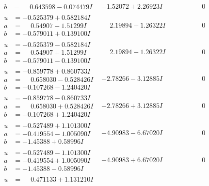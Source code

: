 \documentclass[1p]{elsarticle_modified}
\theoremstyle{definition}
\begin{document}
$$\begin{array}{c|c|c}
\begin{aligned}
b &= \phantom{-}0.643598 - 0.074479 I\end{aligned}
 & -1.52072 + 2.26923 I & \phantom{-0.000000 } 0 \\ \hline\begin{aligned}
u &= -0.525379 + 0.582184 I \\
a &= \phantom{-}0.54907 - 1.51299 I \\
b &= -0.579011 + 0.139100 I\end{aligned}
 & \phantom{-}2.19894 + 1.26322 I & \phantom{-0.000000 } 0 \\ \hline\begin{aligned}
u &= -0.525379 - 0.582184 I \\
a &= \phantom{-}0.54907 + 1.51299 I \\
b &= -0.579011 - 0.139100 I\end{aligned}
 & \phantom{-}2.19894 - 1.26322 I & \phantom{-0.000000 } 0 \\ \hline\begin{aligned}
u &= -0.859778 + 0.860733 I \\
a &= \phantom{-}0.658030 - 0.528426 I \\
b &= -0.107268 - 1.240420 I\end{aligned}
 & -2.78266 - 3.12885 I & \phantom{-0.000000 } 0 \\ \hline\begin{aligned}
u &= -0.859778 - 0.860733 I \\
a &= \phantom{-}0.658030 + 0.528426 I \\
b &= -0.107268 + 1.240420 I\end{aligned}
 & -2.78266 + 3.12885 I & \phantom{-0.000000 } 0 \\ \hline\begin{aligned}
u &= -0.527489 + 1.101300 I \\
a &= -0.419554 - 1.005090 I \\
b &= -1.45388 + 0.58996 I\end{aligned}
 & -4.90983 - 6.67020 I & \phantom{-0.000000 } 0 \\ \hline\begin{aligned}
u &= -0.527489 - 1.101300 I \\
a &= -0.419554 + 1.005090 I \\
b &= -1.45388 - 0.58996 I\end{aligned}
 & -4.90983 + 6.67020 I & \phantom{-0.000000 } 0 \\ \hline\begin{aligned}
u &= \phantom{-}0.471133 + 1.131210 I \\

\end{aligned}
\end{array}$$
\end{document}
